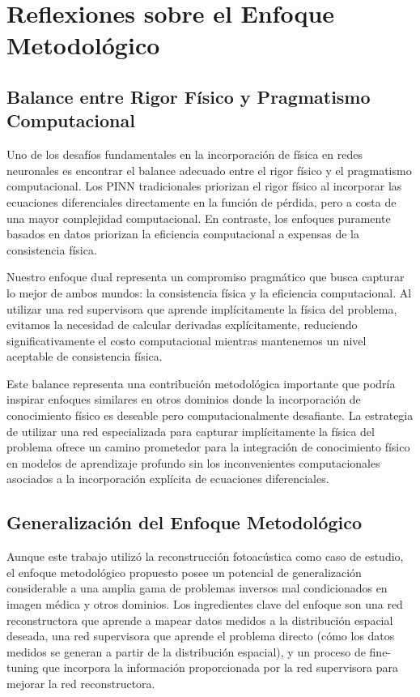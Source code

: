 \section{Reflexiones sobre el Enfoque Metodológico}

\subsection{Balance entre Rigor Físico y Pragmatismo Computacional}

Uno de los desafíos fundamentales en la incorporación de física en redes neuronales es encontrar el balance adecuado entre el rigor físico y el pragmatismo computacional. Los PINN tradicionales priorizan el rigor físico al incorporar las ecuaciones diferenciales directamente en la función de pérdida, pero a costa de una mayor complejidad computacional. En contraste, los enfoques puramente basados en datos priorizan la eficiencia computacional a expensas de la consistencia física.

Nuestro enfoque dual representa un compromiso pragmático que busca capturar lo mejor de ambos mundos: la consistencia física y la eficiencia computacional. Al utilizar una red supervisora que aprende implícitamente la física del problema, evitamos la necesidad de calcular derivadas explícitamente, reduciendo significativamente el costo computacional mientras mantenemos un nivel aceptable de consistencia física.

Este balance representa una contribución metodológica importante que podría inspirar enfoques similares en otros dominios donde la incorporación de conocimiento físico es deseable pero computacionalmente desafiante. La estrategia de utilizar una red especializada para capturar implícitamente la física del problema ofrece un camino prometedor para la integración de conocimiento físico en modelos de aprendizaje profundo sin los inconvenientes computacionales asociados a la incorporación explícita de ecuaciones diferenciales.

\subsection{Generalización del Enfoque Metodológico}

Aunque este trabajo utilizó la reconstrucción fotoacústica como caso de estudio, el enfoque metodológico propuesto posee un potencial de generalización considerable a una amplia gama de problemas inversos mal condicionados en imagen médica y otros dominios. Los ingredientes clave del enfoque son una red reconstructora que aprende a mapear datos medidos a la distribución espacial deseada, una red supervisora que aprende el problema directo (cómo los datos medidos se generan a partir de la distribución espacial), y un proceso de fine-tuning que incorpora la información proporcionada por la red supervisora para mejorar la red reconstructora.

